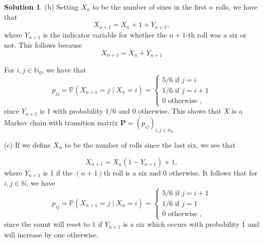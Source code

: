 \documentclass[12pt]{article}
\newcommand{\bbN}{\mathbb{N}}
\newcommand{\Prob}{\mathbb{P}}
\let\vec\mathbf
\theoremstyle{definition}
\newtheorem{sol}{Solution}
\theoremstyle{remark}
\begin{document}
\begin{sol}
(b) Setting $X_{n}$ to be the number of sixes in the first $n$ rolls, we have that
\begin{equation*}
X_{n+1} = X_{n} + 1 + Y_{n+1},
\end{equation*}
where $Y_{n+1}$ is the indicator variable for whether the $n+1$-th roll was a six or not. This follows because 
\begin{equation*}
    X_{n+1} = X_{n} + Y_{n+1}
\end{equation*}

For $i,j\in\bbN_{0}$, we have that 
\begin{equation*}
    p_{ij} = \Prob(X_{n+1} = j \mid X_{n} = i) 
    = 
    \begin{cases}
        5 / 6 \text{ if } j = i\\
        1 / 6 \text{ if } j = i + 1\\
        0 \text{ otherwise },
    \end{cases}
\end{equation*}
since $Y_{n+1}$ is 1 with probability $ 1 / 6$ and 0 otherwise. This shows that $X$ is a Markov chain with transition matrix $\vec{P} = (p_{ij})_{i,j \in \bbN_{0}}$ 


\newpage 

(c) If we define $X_{n}$ to be the number of rolls since the last six, we see that

\begin{equation*}
    X_{n+1} = X_{n}(1 - Y_{n+1}) + 1,
\end{equation*}
where $Y_{n+1}$ is 1 if the $(n+1)$th roll is a six and 0 otherwise. It follows that for $i,j \in \bbN$, we have
\begin{equation*}
    p_{ij} = \Prob(X_{n+1} = j \mid X_{n} = i) 
    =
    \begin{cases}
        5 / 6 \text{ if } j = i + 1\\
        1  / 6 \text{ if } j = 1 \\
        0 \text{ otherwise },
    \end{cases}
\end{equation*}
since the count will reset to $1$ if $Y_{n+1}$ is a six which occurs with probability 1 and will increase by one otherwise.

\newpage


\end{sol}
\end{document}
